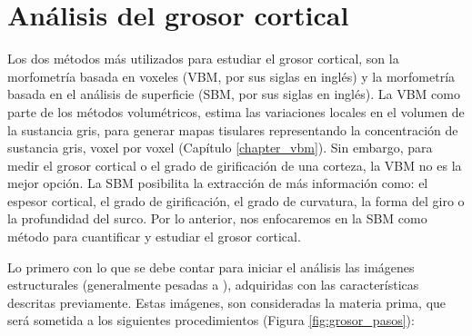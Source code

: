 \section{Análisis del grosor cortical}
Los dos métodos más utilizados para estudiar el grosor cortical, son la morfometría basada en voxeles
(VBM, por sus siglas en inglés) y la morfometría basada en el análisis de superficie (SBM, por sus siglas en inglés). La VBM como parte de los métodos volumétricos, estima las variaciones locales en el volumen de la sustancia gris, para generar mapas tisulares representando la concentración de
sustancia gris, voxel por voxel (Capítulo \ref{chapter_vbm}). Sin embargo, para medir el grosor cortical o el grado de girificación de una corteza, la VBM no es la mejor opción. La SBM posibilita la extracción de más
información como: el espesor cortical, el grado de girificación, el grado de curvatura, la forma del giro
o la profundidad del surco. Por lo anterior, nos enfocaremos en la SBM como método para cuantificar
y estudiar el grosor cortical. 

Lo primero con lo que se debe contar para iniciar el análisis las imágenes estructurales (generalmente
pesadas a \Tone), adquiridas con las características descritas previamente. Estas imágenes, son
consideradas la materia prima, que será sometida a los siguientes procedimientos (Figura \ref{fig:grosor_pasos}):


